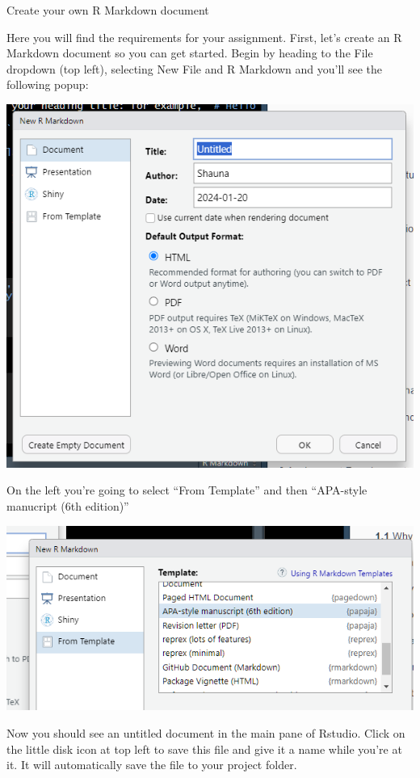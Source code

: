 \documentclass[
]{html}
\theoremstyle{definition}
\theoremstyle{definition}
\theoremstyle{definition}
\theoremstyle{definition}
\theoremstyle{remark}
\begin{document}
Create your own R Markdown document

Here you will find the requirements for your assignment. First, let's create an R Markdown document so you can get started. Begin by heading to the File dropdown (top left), selecting New File and R Markdown and you'll see the following popup:

\includegraphics[width=5.55208in,height=\textheight]{images/clipboard-2848079311.png}

On the left you're going to select ``From Template'' and then ``APA-style manucript (6th edition)''

\includegraphics{images/clipboard-1990732896.png}

Now you should see an untitled document in the main pane of Rstudio. Click on the little disk icon at top left to save this file and give it a name while you're at it. It will automatically save the file to your project folder.
\end{document}
